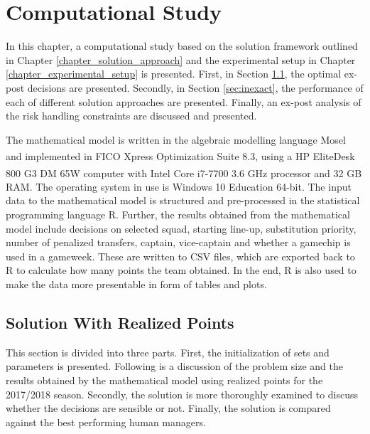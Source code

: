 
\chapter{Computational Study} \label{chapter_computational_study}


In this chapter, a computational study based on the solution framework outlined in Chapter \ref{chapter_solution_approach} and the experimental setup in Chapter \ref{chapter_experimental_setup} is presented. First, in Section \ref{sec:exact}, the optimal ex-post decisions are presented. Secondly, in Section \ref{sec:inexact}, the performance of each of different solution approaches are presented. Finally, an ex-post analysis of the risk handling constraints are discussed and presented. 

\newpar

The mathematical model is written in the algebraic modelling language Mosel and implemented in FICO\textsuperscript {\textregistered} Xpress Optimization Suite 8.3, using a HP EliteDesk 800 G3 DM 65W computer with Intel\textsuperscript{\textregistered} Core\textsuperscript{\texttrademark} i7-7700 3.6 GHz processor and 32 GB RAM. The operating system in use is Windows 10 Education 64-bit. The input data to the mathematical model is structured and pre-processed in the statistical programming language R. Further, the results obtained from the mathematical model include decisions on selected squad, starting line-up, substitution priority, number of penalized transfers, captain, vice-captain and whether a gamechip is used in a gameweek. These are written to CSV files, which are exported back to R to calculate how many points the team obtained. In the end, R is also used to make the data more presentable in form of tables and plots. 

\section{Solution With Realized Points}\label{sec:exact}
This section is divided into three parts. First, the initialization of sets and parameters is presented. Following is a discussion of the problem size and the results obtained by the mathematical model using realized points for the 2017/2018 season. Secondly, the solution is more thoroughly examined to discuss whether the decisions are sensible or not. Finally, the solution is compared against the best performing human managers. 


